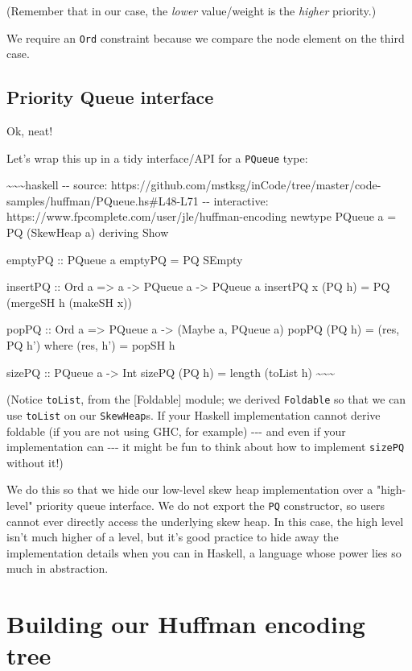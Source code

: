 \documentclass[]{article}
\begin{document}
(Remember that in our case, the \emph{lower} value/weight is the \emph{higher}
priority.)

We require an \texttt{Ord} constraint because we compare the node element on the
third case.

\subsection{Priority Queue interface}

Ok, neat!

Let's wrap this up in a tidy interface/API for a \texttt{PQueue} type:

\textasciitilde{}\textasciitilde{}\textasciitilde{}haskell -\/- source:
https://github.com/mstksg/inCode/tree/master/code-samples/huffman/PQueue.hs\#L48-L71
-\/- interactive: https://www.fpcomplete.com/user/jle/huffman-encoding newtype
PQueue a = PQ (SkewHeap a) deriving Show

emptyPQ :: PQueue a emptyPQ = PQ SEmpty

insertPQ :: Ord a =\textgreater{} a -\textgreater{} PQueue a -\textgreater{}
PQueue a insertPQ x (PQ h) = PQ (mergeSH h (makeSH x))

popPQ :: Ord a =\textgreater{} PQueue a -\textgreater{} (Maybe a, PQueue a)
popPQ (PQ h) = (res, PQ h') where (res, h') = popSH h

sizePQ :: PQueue a -\textgreater{} Int sizePQ (PQ h) = length (toList h)
\textasciitilde{}\textasciitilde{}\textasciitilde{}

(Notice \texttt{toList}, from the {[}Foldable{]} module; we derived
\texttt{Foldable} so that we can use \texttt{toList} on our \texttt{SkewHeap}s.
If your Haskell implementation cannot derive foldable (if you are not using GHC,
for example) -\/-\/- and even if your implementation can -\/-\/- it might be fun
to think about how to implement \texttt{sizePQ} without it!)

We do this so that we hide our low-level skew heap implementation over a
"high-level" priority queue interface. We do not export the \texttt{PQ}
constructor, so users cannot ever directly access the underlying skew heap. In
this case, the high level isn't much higher of a level, but it's good practice
to hide away the implementation details when you can in Haskell, a language
whose power lies so much in abstraction.

\section{Building our Huffman encoding tree}
\end{document}
